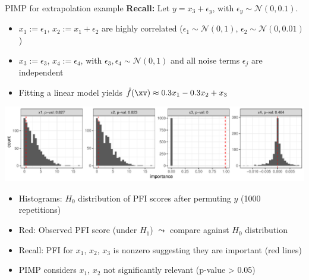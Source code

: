 \documentclass[11pt,compress,t,notes=noshow, aspectratio=169, xcolor=table]{beamer}
\begin{document}
\begin{frame}{PIMP for extrapolation example}
\textbf{Recall:} 
 Let $y = x_3 + \epsilon_y$, with $\epsilon_y \sim \mathcal{N}(0, 0.1)$.

\begin{itemize}
  \item $x_1 := \epsilon_1$, $x_2 := x_1 + \epsilon_2$ are highly correlated  
        ($\epsilon_1 \sim \mathcal{N}(0,1)$, $\epsilon_2 \sim \mathcal{N}(0, 0.01)$)
  \item $x_3 := \epsilon_3$, $x_4 := \epsilon_4$, with $\epsilon_3, \epsilon_4 \sim \mathcal{N}(0,1)$ and all noise terms $\epsilon_j$ are independent
  \item Fitting a linear model yields $\hat{f}(\xv) \approx 0.3 x_1 - 0.3 x_2 + x_3$
\end{itemize}

%
  \includegraphics[width=\linewidth]{figure_man/pimp.pdf}

\begin{itemize}
    \item Histograms: $H_0$ distribution of PFI scores after permuting $y$ (1000 repetitions)
    \item Red: Observed PFI score (under $H_1$) $\leadsto$ compare against $H_0$ distribution
    \item Recall: PFI for $x_1$, $x_2$, $x_3$ is nonzero suggesting they are important (red lines)
    \item PIMP considers $x_1$, $x_2$ not significantly relevant (p-value > 0.05) 

\end{itemize}
\end{frame}
\end{document}
